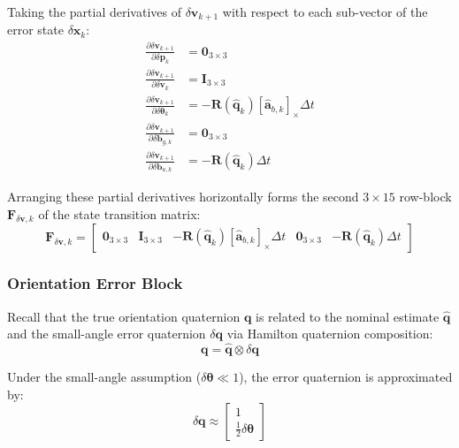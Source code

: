 \documentclass{article}
\begin{document}
	Taking the partial derivatives of $\delta\mathbf{v}_{k+1}$ with respect to each sub-vector of the error state $\delta\mathbf{x}_k$:
	\begin{align*}
		\frac{\partial \delta\mathbf{v}_{k+1}}{\partial \delta\mathbf{p}_k} &= \mathbf{0}_{3 \times 3} \\
		\frac{\partial \delta\mathbf{v}_{k+1}}{\partial \delta\mathbf{v}_k} &= \mathbf{I}_{3 \times 3} \\
		\frac{\partial \delta\mathbf{v}_{k+1}}{\partial \delta\bm{\theta}_k} &= -\mathbf{R}(\hat{\mathbf{q}}_k) [\hat{\mathbf{a}}_{b,k}]_\times \Delta t \\
		\frac{\partial \delta\mathbf{v}_{k+1}}{\partial \delta\mathbf{b}_{g,k}} &= \mathbf{0}_{3 \times 3} \\
		\frac{\partial \delta\mathbf{v}_{k+1}}{\partial \delta\mathbf{b}_{a,k}} &= -\mathbf{R}(\hat{\mathbf{q}}_k) \Delta t
	\end{align*}
	
	Arranging these partial derivatives horizontally forms the second $3 \times 15$ row-block $\mathbf{F}_{\delta\mathbf{v}, k}$ of the state transition matrix:
	\begin{equation*}
		\mathbf{F}_{\delta\mathbf{v}, k} = 
		\begin{bmatrix}
			\mathbf{0}_{3 \times 3} & \mathbf{I}_{3 \times 3} & -\mathbf{R}(\hat{\mathbf{q}}_k) [\hat{\mathbf{a}}_{b,k}]_\times \Delta t & \mathbf{0}_{3 \times 3} & -\mathbf{R}(\hat{\mathbf{q}}_k) \Delta t
		\end{bmatrix}
	\end{equation*}
	
	\subsubsection{Orientation Error Block}
	
	Recall that the true orientation quaternion $\mathbf{q}$ is related to the nominal estimate $\hat{\mathbf{q}}$ and the small-angle error quaternion $\delta\mathbf{q}$ via Hamilton quaternion composition:
	\begin{equation*}
		\mathbf{q} = \hat{\mathbf{q}} \otimes \delta\mathbf{q}
	\end{equation*}
	
	Under the small-angle assumption ($\delta\bm{\theta} \ll 1$), the error quaternion is approximated by:
	\begin{equation*}
		\delta\mathbf{q} \approx 
		\begin{bmatrix} 
			1 \\ 
			\frac{1}{2}\delta\bm{\theta} 
		\end{bmatrix}
	\end{equation*}
	
\end{document}
